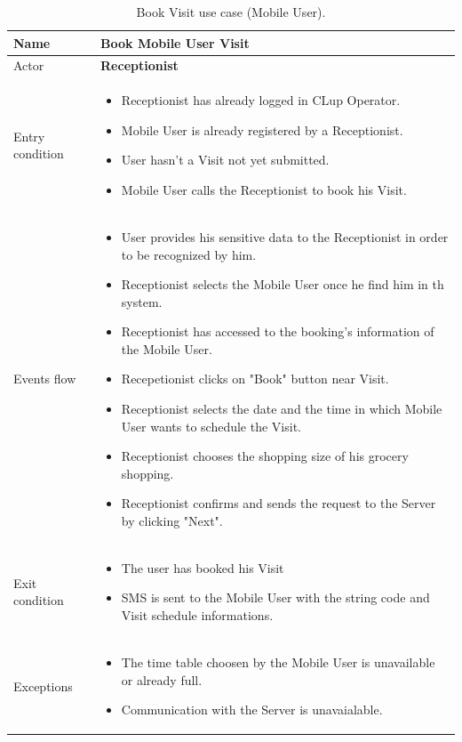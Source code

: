 \begin{table}[H]\begin{tabular}{|p{5cm} | p{7cm} | }
	\hline
	Name & \textbf{Book Mobile User Visit}  \\
	\hline
	Actor & \textbf{Receptionist} \\
	\hline
	Entry condition &
	\begin{itemize}
		\item Receptionist has already logged in CLup Operator. 
 		\item Mobile User is already registered by a Receptionist.
		\item User hasn't a Visit not yet submitted. 
        \item Mobile User calls the Receptionist to book his Visit.
	\end{itemize} \\
	\hline
	Events flow & 
	\begin{itemize}
		\item User provides his sensitive data to the Receptionist in order to be recognized by him. 
        \item Receptionist selects the Mobile User once he find him in th system.
		\item Receptionist has accessed to the booking's information of the Mobile User.
        \item Recepetionist clicks on "Book" button near Visit.
		\item Receptionist selects the date and the time in which Mobile User wants to schedule the Visit.
		\item Receptionist chooses the shopping size of his grocery shopping.
		\item Receptionist confirms and sends the request to the Server by clicking "Next".
	\end{itemize} \\
	\hline
	Exit condition & \begin{itemize}
	\item The user has booked his Visit
    \item SMS is sent to the Mobile User with the string code and Visit schedule informations. 
    \end{itemize}\\
	\hline 
	Exceptions & 
	\begin{itemize}
    \item The time table choosen by the Mobile User is unavailable or already full.
    \item Communication with the Server is unavaialable.
    \end{itemize} \\
	\hline
\end{tabular}
\caption{Book Visit use case (Mobile User).}
\end{table}
\bigbreak

